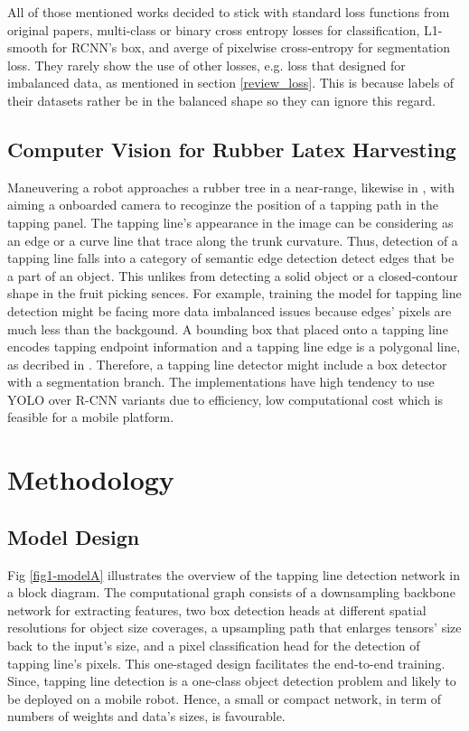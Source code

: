 \documentclass[default,pdflatex,iicol]{sn-jnl}%
\begin{document}
All of those mentioned works decided to stick with standard loss functions from original papers, multi-class or binary cross entropy losses for classification, L1-smooth for RCNN's box, and averge of pixelwise cross-entropy for segmentation loss. They rarely show the use of other losses, e.g. loss that designed for imbalanced data, as mentioned in section \ref{review_loss}. This is because labels of their datasets rather be in the balanced shape so they can ignore this regard.

\subsection{Computer Vision for Rubber Latex Harvesting}
Maneuvering a robot approaches a rubber tree in a near-range, likewise in \cite{zhang2019rubber, WANG2022103906}, with aiming a onboarded camera to recoginze the position of a tapping path in the tapping panel. The tapping line's appearance in the image can be considering as an edge or a curve line that trace along the trunk curvature. Thus, detection of a tapping line falls into a category of semantic edge detection \textemdash detect edges that be a part of an object. This unlikes from detecting a solid object or a closed-contour shape in the fruit picking sences. For example, training the model for tapping line detection might be facing more data imbalanced issues because edges' pixels are much less than the backgound. A bounding box that placed onto a tapping line encodes tapping endpoint information and a tapping line edge is a polygonal line, as decribed in \cite{Wongtanawijit_2021}. Therefore, a tapping line detector might include a box detector with a segmentation branch. The implementations have high tendency to use YOLO over R-CNN variants due to efficiency, low computational cost which is feasible for a mobile platform.


\section{Methodology}\label{sec-methodology}


\subsection{Model Design}\label{subsec-model}
Fig \ref{fig1-modelA} illustrates the overview of the tapping line detection network in a block diagram. The computational graph consists of a downsampling backbone network for extracting features, two box detection heads at different spatial resolutions for object size coverages, a upsampling path that enlarges tensors' size back to the input's size, and a pixel classification head for the detection of tapping line's pixels. This one-staged design facilitates the end-to-end training. Since, tapping line detection is a one-class object detection problem and likely to be deployed on a mobile robot. Hence, a small or compact network, in term of numbers of weights and data's sizes, is favourable.
\end{document}
